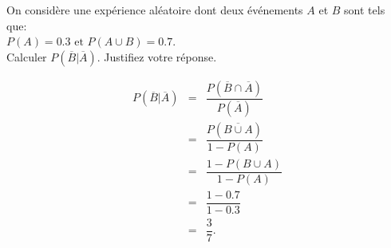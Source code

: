 





\question[3]\label{probabilite} 

On considère une expérience aléatoire dont deux événements  $A$ et $B$ sont tels que:\\ $P(A) = 0.3 \text{ et } P(A \cup B) = 0.7$.\\ 

Calculer $P(\overline{B}|\overline{A})$. Justifiez votre réponse.\\

\emptybox{15cm}

\begin{solution}
\begin{eqnarray*}
   P(\overline{B}|\overline{A})      &=&  \dfrac{P(\overline{B}\cap \overline{A})}{P(\overline{A})}\\
                                    &=&  \dfrac{P(\overline{B\cup A})}{1-P(A)}\\
                                    &=&  \dfrac{1-P(B\cup A)}{1-P(A)}\\
                                    &=&  \dfrac{1-0.7}{1-0.3}\\
                                    &=&  \dfrac{3}{7} .
\end{eqnarray*}
\end{solution}




\newpage